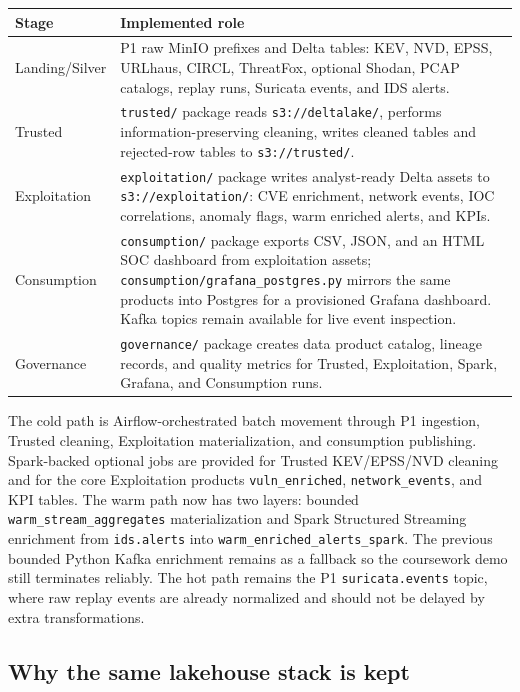 \documentclass[11pt,a4paper]{article}
\newcommand{\code}[1]{\nolinkurl{#1}}
\newcommand{\hdr}{\rowcolor{csiHead}}
\begin{document}
\begin{tabularx}{\textwidth}{>{\raggedright\arraybackslash}p{2.8cm}X}
\toprule
\hdr
\textbf{Stage} & \textbf{Implemented role}\\
\midrule
Landing/Silver & P1 raw MinIO prefixes and Delta tables: KEV, NVD, EPSS, URLhaus, CIRCL, ThreatFox, optional Shodan, PCAP catalogs, replay runs, Suricata events, and IDS alerts.\\
Trusted & \code{trusted/} package reads \code{s3://deltalake/}, performs information-preserving cleaning, writes cleaned tables and rejected-row tables to \code{s3://trusted/}.\\
Exploitation & \code{exploitation/} package writes analyst-ready Delta assets to \code{s3://exploitation/}: CVE enrichment, network events, IOC correlations, anomaly flags, warm enriched alerts, and KPIs.\\
Consumption & \code{consumption/} package exports CSV, JSON, and an HTML SOC dashboard from exploitation assets; \code{consumption/grafana_postgres.py} mirrors the same products into Postgres for a provisioned Grafana dashboard. Kafka topics remain available for live event inspection.\\
Governance & \code{governance/} package creates data product catalog, lineage records, and quality metrics for Trusted, Exploitation, Spark, Grafana, and Consumption runs.\\
\bottomrule
\end{tabularx}

The cold path is Airflow-orchestrated batch movement through P1 ingestion, Trusted cleaning, Exploitation materialization, and consumption publishing. Spark-backed optional jobs are provided for Trusted KEV/EPSS/NVD cleaning and for the core Exploitation products \code{vuln_enriched}, \code{network_events}, and KPI tables. The warm path now has two layers: bounded \code{warm_stream_aggregates} materialization and Spark Structured Streaming enrichment from \code{ids.alerts} into \code{warm_enriched_alerts_spark}. The previous bounded Python Kafka enrichment remains as a fallback so the coursework demo still terminates reliably. The hot path remains the P1 \code{suricata.events} topic, where raw replay events are already normalized and should not be delayed by extra transformations.

\subsection{Why the same lakehouse stack is kept}
\end{document}
